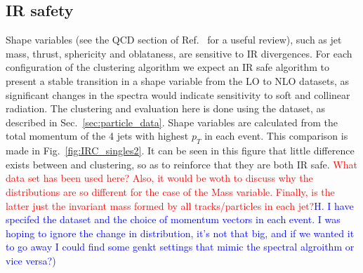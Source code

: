 \subsection{IR safety}
Shape variables (see the QCD section of Ref.~\cite{Altarelli:116932} for a useful review), such as jet mass, thrust, sphericity and oblataness,  are sensitive to IR divergences.
For each configuration of the clustering algorithm we expect an IR safe algorithm to present a stable transition
in a shape variable from the LO to NLO datasets, as significant
changes in the spectra would indicate sensitivity to soft and collinear radiation.
The clustering and evaluation here is done using the  dataset, as described in Sec.~\ref{sec:particle_data}.
Shape variables are calculated from the total momentum of the 4 jets with highest \(p_T\) in each event.
This comparison is made in Fig.~\ref{fig:IRC_singles2}.
It can be seen in this figure that little difference exists between \genkt{} and \spectral{} clustering, so as to reinforce that they are both IR safe.
{\textcolor{red}{What data set has been used here? Also, it would be woth to discuss why the distributions are so different for the case of the Mass variable. Finally, is the latter just the invariant mass formed by all tracks/particles in each jet?}\textcolor{blue}{H. I have specifed the dataset and the choice of momentum vectors in each event. I was hoping to ignore the change in distribution, it's not that big, and if we wanted it to go away I could find some genkt settings that mimic the spectral algroithm or vice versa?)}}

